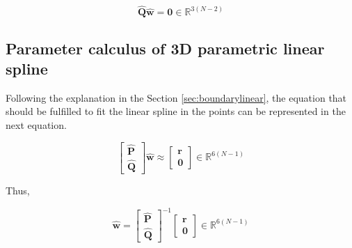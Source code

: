 \begin{equation}
\mathbf{\hat{Q}}
\mathbf{\hat{w}}
=\mathbf{0}\in \mathbb{R}^{3(N-2)}
\end{equation}

\subsection{Parameter calculus of 3D parametric linear spline}
\label{sec:solvelinearspline}
Following the explanation in the Section \ref{sec:boundarylinear},
the equation that should be fulfilled to fit the linear spline in the points can be represented in the next equation.

\begin{equation}
\begin{bmatrix}
\mathbf{\hat{P}}\\
\mathbf{\hat{Q}}
\end{bmatrix}
\mathbf{\hat{w}}
\approx
\begin{bmatrix}
\mathbf{r}\\
\mathbf{0}
\end{bmatrix}
\in \mathbb{R}^{6(N-1)}
\end{equation}

Thus, %

\begin{equation}
\mathbf{\hat{w}}
=
\begin{bmatrix}
\mathbf{\hat{P}}\\
\mathbf{\hat{Q}}
\end{bmatrix}^{-1}
\begin{bmatrix}
\mathbf{r}\\
\mathbf{0}
\end{bmatrix}
\in \mathbb{R}^{6(N-1)}
\end{equation}
